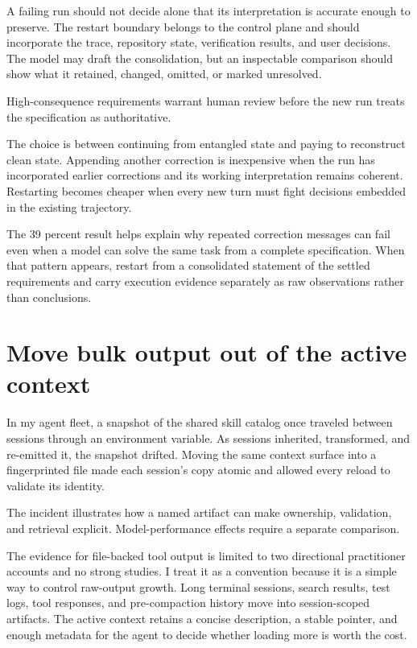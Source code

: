A failing run should not decide alone that its interpretation is accurate enough to preserve. The restart boundary belongs to the control plane and should incorporate the trace, repository state, verification results, and user decisions. The model may draft the consolidation, but an inspectable comparison should show what it retained, changed, omitted, or marked unresolved.

High-consequence requirements warrant human review before the new run treats the specification as authoritative.

The choice is between continuing from entangled state and paying to reconstruct clean state. Appending another correction is inexpensive when the run has incorporated earlier corrections and its working interpretation remains coherent. Restarting becomes cheaper when every new turn must fight decisions embedded in the existing trajectory.

The 39 percent result helps explain why repeated correction messages can fail even when a model can solve the same task from a complete specification. When that pattern appears, restart from a consolidated statement of the settled requirements and carry execution evidence separately as raw observations rather than conclusions.

\hypertarget{move-bulk-output-out-of-the-active-context}{%
\section{Move bulk output out of the active context}\label{move-bulk-output-out-of-the-active-context}}

In my agent fleet, a snapshot of the shared skill catalog once traveled between sessions through an environment variable. As sessions inherited, transformed, and re-emitted it, the snapshot drifted. Moving the same context surface into a fingerprinted file made each session's copy atomic and allowed every reload to validate its identity.

The incident illustrates how a named artifact can make ownership, validation, and retrieval explicit. Model-performance effects require a separate comparison.

The evidence for file-backed tool output is limited to two directional practitioner accounts and no strong studies. I treat it as a convention because it is a simple way to control raw-output growth. Long terminal sessions, search results, test logs, tool responses, and pre-compaction history move into session-scoped artifacts. The active context retains a concise description, a stable pointer, and enough metadata for the agent to decide whether loading more is worth the cost.

